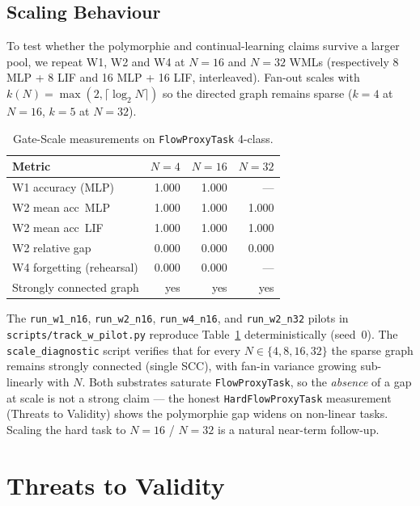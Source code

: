 \documentclass[10pt,twocolumn]{article}
\begin{document}
\subsection{Scaling Behaviour}
\label{sec:scaling}

To test whether the polymorphie and continual-learning claims survive
a larger pool, we repeat W1, W2 and W4 at $N = 16$ and $N = 32$ WMLs
(respectively 8 MLP + 8 LIF and 16 MLP + 16 LIF, interleaved).
Fan-out scales with $k(N) = \max(2, \lceil \log_2 N \rceil)$ so the
directed graph remains sparse ($k = 4$ at $N = 16$, $k = 5$ at $N = 32$).

\begin{table}[t]
  \centering
  \caption{Gate-Scale measurements on \texttt{FlowProxyTask} 4-class.}
  \label{tab:scaling}
  \small
  \begin{tabular}{lrrr}
    \hline
    Metric & $N = 4$ & $N = 16$ & $N = 32$ \\
    \hline
    W1 accuracy (MLP)          & 1.000 & 1.000 & --- \\
    W2 mean acc\ MLP           & 1.000 & 1.000 & 1.000 \\
    W2 mean acc\ LIF           & 1.000 & 1.000 & 1.000 \\
    W2 relative gap            & 0.000 & 0.000 & 0.000 \\
    W4 forgetting (rehearsal)  & 0.000 & 0.000 & --- \\
    Strongly connected graph   & yes   & yes   & yes \\
    \hline
  \end{tabular}
\end{table}

The \texttt{run\_w1\_n16}, \texttt{run\_w2\_n16}, \texttt{run\_w4\_n16},
and \texttt{run\_w2\_n32} pilots in \texttt{scripts/track\_w\_pilot.py}
reproduce Table~\ref{tab:scaling} deterministically (seed~0). The
\texttt{scale\_diagnostic} script verifies that for every
$N \in \{4, 8, 16, 32\}$ the sparse graph remains strongly connected
(single SCC), with fan-in variance growing sub-linearly with $N$.
Both substrates saturate \texttt{FlowProxyTask}, so the \emph{absence}
of a gap at scale is not a strong claim --- the honest
\texttt{HardFlowProxyTask} measurement (Threats to Validity) shows
the polymorphie gap widens on non-linear tasks. Scaling the hard
task to $N = 16$ / $N = 32$ is a natural near-term follow-up.

\section{Threats to Validity}
\end{document}
